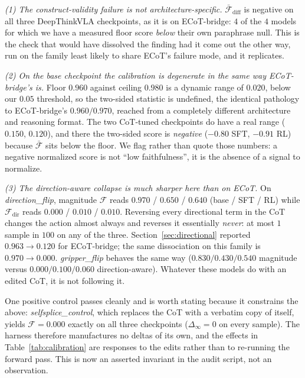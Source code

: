 \documentclass{article}
\begin{document}
\emph{(1) The construct-validity failure is not architecture-specific.} $\bar{\mathcal{F}}_{\text{diff}}$ is negative on all three DeepThinkVLA checkpoints, as it is on ECoT-bridge: $4$ of the $4$ models for which we have a measured floor score \emph{below} their own paraphrase null. This is the check that would have dissolved the finding had it come out the other way, run on the family least likely to share ECoT's failure mode, and it replicates.

\emph{(2) On the base checkpoint the calibration is degenerate in the same way ECoT-bridge's is.} Floor $0.960$ against ceiling $0.980$ is a dynamic range of $0.020$, below our $0.05$ threshold, so the two-sided statistic is undefined, the identical pathology to ECoT-bridge's $0.960/0.970$, reached from a completely different architecture and reasoning format. The two CoT-tuned checkpoints do have a real range ($0.150$, $0.120$), and there the two-sided score is \emph{negative} ($-0.80$ SFT, $-0.91$ RL) because $\bar{\mathcal{F}}$ sits below the floor. We flag rather than quote those numbers: a negative normalized score is not ``low faithfulness'', it is the absence of a signal to normalize.

\emph{(3) The direction-aware collapse is much sharper here than on ECoT.} On \emph{direction\_flip}, magnitude $\mathcal{F}$ reads $0.970$ / $0.650$ / $0.640$ (base / SFT / RL) while $\mathcal{F}_{\text{dir}}$ reads $0.000$ / $0.010$ / $0.010$. Reversing every directional term in the CoT changes the action almost always and reverses it essentially \emph{never}: at most $1$ sample in $100$ on any of the three. Section~\ref{sec:directional} reported $0.963 \to 0.120$ for ECoT-bridge; the same dissociation on this family is $0.970 \to 0.000$. \emph{gripper\_flip} behaves the same way ($0.830/0.430/0.540$ magnitude versus $0.000/0.100/0.060$ direction-aware). Whatever these models do with an edited CoT, it is not following it.

One positive control passes cleanly and is worth stating because it constrains the above: \emph{selfsplice\_control}, which replaces the CoT with a verbatim copy of itself, yields $\mathcal{F} = 0.000$ exactly on all three checkpoints ($\Delta_\infty = 0$ on every sample). The harness therefore manufactures no deltas of its own, and the effects in Table~\ref{tab:calibration} are responses to the edits rather than to re-running the forward pass. This is now an asserted invariant in the audit script, not an observation.
\end{document}
